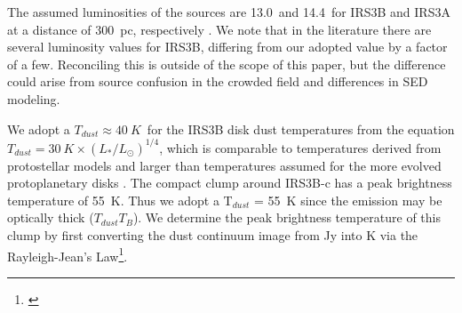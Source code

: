 The assumed luminosities of the sources are  13.0~\lsun\space and 14.4~\lsun\space for IRS3B and IRS3A at a distance of 300~pc, respectively \citep[8.3~\lsun\space and 9.2~\lsun\space for IRS3B and IRS3A, respectively at 230~pc; ][]{2016ApJ...818...73T}. We note that in the literature there are several luminosity values for IRS3B, differing from our adopted value by a factor of a few. Reconciling this is outside of the scope of this paper, but the difference could arise from source confusion in the crowded field and differences in SED modeling.

We adopt a $T_{dust}\approx40~K$~for the IRS3B disk dust temperatures from the equation $T_{dust}=30~K\times\left(L_{*} / L_{\odot}\right)^{1/4}$, which is comparable to temperatures derived from protostellar models \citep[43~K:][]{2013ApJ...771...48T} and larger than temperatures assumed for the more evolved protoplanetary disks \citep[25~K:][]{2013ApJ...771..129A}. The compact clump around IRS3B-c has a peak brightness temperature of 55~K. Thus we adopt a T$_{dust}$ = 55~K since the emission may be optically thick ($T_{dust}$\ab $T_{B}$). We determine the peak brightness temperature of this clump by first converting the dust continuum image from Jy into K via the Rayleigh-Jean's Law\footnote{\citep[T = 1.222$\times10^3\frac{I~mJy~beam^{-1}}{(\nu~GHz)^2(\theta_{major}~arcsec)(\theta_{minor}~arcsec)}$~K, ][]{2009tra..book.....W}}.

